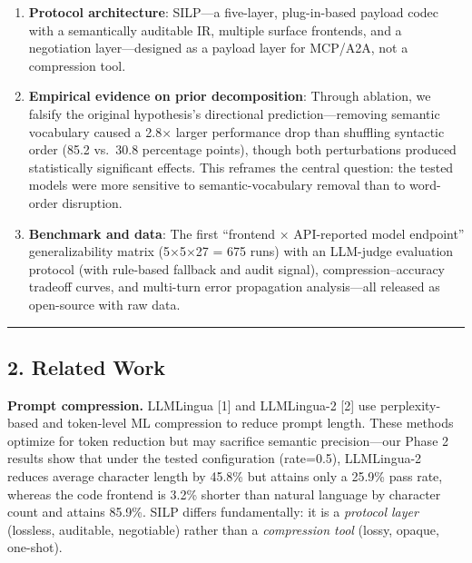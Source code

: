 \begin{enumerate}

\def\labelenumi{\arabic{enumi}.}

\tightlist

\item

  \textbf{Protocol architecture}: SILP---a five-layer, plug-in-based payload codec with a semantically auditable IR, multiple surface frontends, and a negotiation layer---designed as a payload layer for MCP/A2A, not a compression tool.

\item

  \textbf{Empirical evidence on prior decomposition}: Through ablation, we falsify the original hypothesis's directional prediction---removing semantic vocabulary caused a 2.8× larger performance drop than shuffling syntactic order (85.2 vs.~30.8 percentage points), though both perturbations produced statistically significant effects. This reframes the central question: the tested models were more sensitive to semantic-vocabulary removal than to word-order disruption.

\item

  \textbf{Benchmark and data}: The first ``frontend × API-reported model endpoint'' generalizability matrix (5×5×27 = 675 runs) with an LLM-judge evaluation protocol (with rule-based fallback and audit signal), compression--accuracy tradeoff curves, and multi-turn error propagation analysis---all released as open-source with raw data.

\end{enumerate}



\begin{center}\rule{0.5\linewidth}{0.5pt}\end{center}



\subsection{2. Related Work}\label{related-work}



\textbf{Prompt compression.} LLMLingua {[}1{]} and LLMLingua-2 {[}2{]} use perplexity-based and token-level ML compression to reduce prompt length. These methods optimize for token reduction but may sacrifice semantic precision---our Phase 2 results show that under the tested configuration (rate=0.5), LLMLingua-2 reduces average character length by 45.8\% but attains only a 25.9\% pass rate, whereas the code frontend is 3.2\% shorter than natural language by character count and attains 85.9\%. SILP differs fundamentally: it is a \emph{protocol layer} (lossless, auditable, negotiable) rather than a \emph{compression tool} (lossy, opaque, one-shot).



